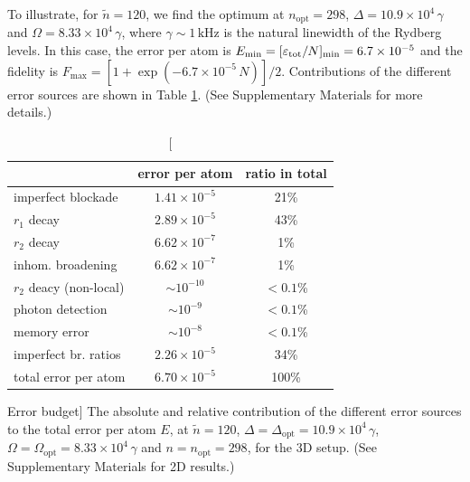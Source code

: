 To illustrate, for $\tilde n = 120$, we find the optimum at $n_\mathrm{opt} =
298$, $\Delta = 10.9\times 10^4 \,\gamma$ and $\Omega = 8.33\times
10^4\,\gamma$, where $\gamma \sim 1\,\mathrm{kHz}$ is the natural linewidth of the
Rydberg levels. In this case, the error per atom is $E_\mathrm{min}=
[\varepsilon_\mathrm{tot}/N]_\mathrm{min} = 6.7\times 10^{-5}$ and the fidelity is
$F_\mathrm{max} = [1 + \exp(-6.7\times 10^{-5}\,N)]/2$.
Contributions of the different error sources are shown in Table
\ref{table:errors}. (See Supplementary
Materials for more details.)
\begin{table}
\centering
\begin{tabular}{|l|c|c|}
\hline
 & error per atom & ratio in total\\
\hline
imperfect blockade & $1.41 \times 10^{-5}$ & 21\%\\
$r_1$ decay & $2.89 \times 10^{-5}$ & 43\%\\
$r_2$ decay & $6.62 \times 10^{-7}$ & 1\%\\
inhom. broadening & $6.62 \times 10^{-7}$ & 1\%\\
$r_2$ deacy (non-local) & $ \sim 10^{-10}$ & $<0.1$\%\\
photon detection & $ \sim 10^{-9}$ & $<0.1$\%\\
memory error & $ \sim 10^{-8}$ & $<0.1$\%\\
imperfect br. ratios & $2.26 \times 10^{-5}$ & 34\%\\
\hline
total error per atom & $6.70 \times 10^{-5}$ & 100\%\\
\hline
\end{tabular}
\caption
[Error budget]{
\label{table:errors}
The absolute and relative contribution of the different error sources to the
total error per atom $E$, at $\tilde n = 120$, $\Delta =
\Delta_\mathrm{opt} = 10.9\times 10^4\,\gamma$, $\Omega = \Omega_\mathrm{opt} = 
8.33\times 10^4\,\gamma$ and $n = n_\mathrm{opt} = 298$, for the 3D setup. (See
Supplementary Materials for 2D results.)}
\end{table}

